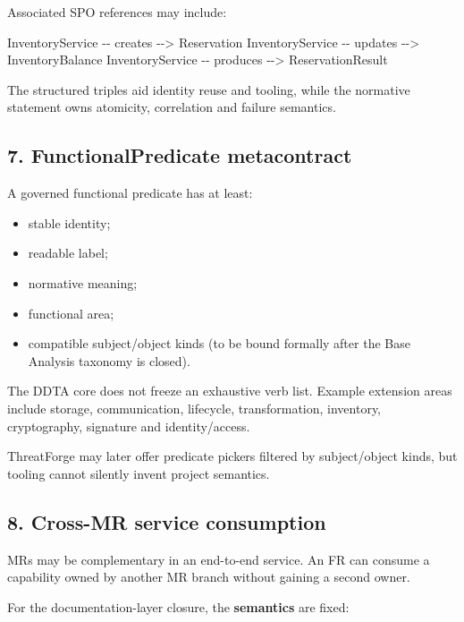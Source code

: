 \documentclass[
  10pt,
]{article}
\newenvironment{Shaded}{}{}
\newcommand{\NormalTok}[1]{#1}
\providecommand{\tightlist}{%
  \setlength{\itemsep}{0pt}\setlength{\parskip}{0pt}}
\begin{document}
Associated SPO references may include:

\begin{Shaded}
\begin{Highlighting}[]
\NormalTok{InventoryService {-}{-} creates {-}{-}\textgreater{} Reservation}
\NormalTok{InventoryService {-}{-} updates {-}{-}\textgreater{} InventoryBalance}
\NormalTok{InventoryService {-}{-} produces {-}{-}\textgreater{} ReservationResult}
\end{Highlighting}
\end{Shaded}

The structured triples aid identity reuse and tooling, while the
normative statement owns atomicity, correlation and failure semantics.

\subsection{7. FunctionalPredicate
metacontract}\label{7-functionalpredicate-metacontract}

A governed functional predicate has at least:

\begin{itemize}
\tightlist
\item
  stable identity;
\item
  readable label;
\item
  normative meaning;
\item
  functional area;
\item
  compatible subject/object kinds (to be bound formally after the Base
  Analysis taxonomy is closed).
\end{itemize}

The DDTA core does not freeze an exhaustive verb list. Example extension
areas include storage, communication, lifecycle, transformation,
inventory, cryptography, signature and identity/access.

ThreatForge may later offer predicate pickers filtered by subject/object
kinds, but tooling cannot silently invent project semantics.

\subsection{8. Cross-MR service
consumption}\label{8-cross-mr-service-consumption}

MRs may be complementary in an end-to-end service. An FR can consume a
capability owned by another MR branch without gaining a second owner.

For the documentation-layer closure, the \textbf{semantics} are fixed:
\end{document}

